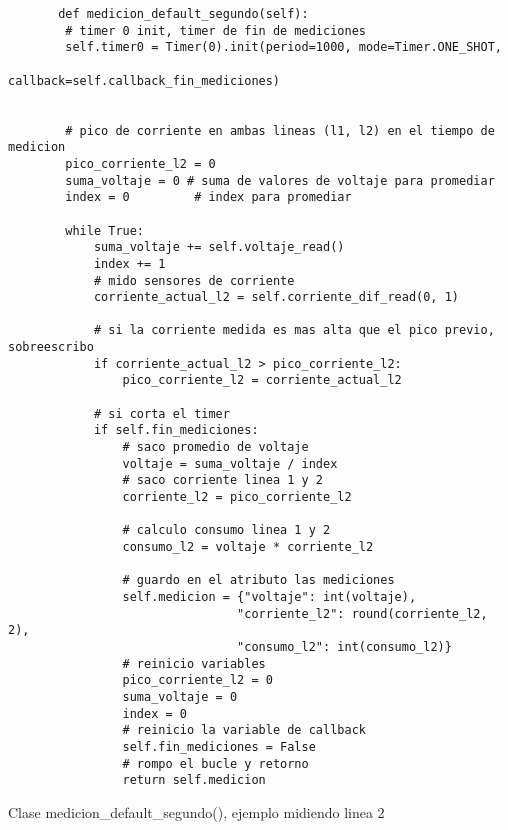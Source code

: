 \begin{listing}[H]
\begin{verbatim}
       def medicion_default_segundo(self):
        # timer 0 init, timer de fin de mediciones
        self.timer0 = Timer(0).init(period=1000, mode=Timer.ONE_SHOT, 
                                    callback=self.callback_fin_mediciones) 


        # pico de corriente en ambas lineas (l1, l2) en el tiempo de medicion
        pico_corriente_l2 = 0
        suma_voltaje = 0 # suma de valores de voltaje para promediar
        index = 0         # index para promediar
       
        while True:
            suma_voltaje += self.voltaje_read()
            index += 1
            # mido sensores de corriente
            corriente_actual_l2 = self.corriente_dif_read(0, 1)

            # si la corriente medida es mas alta que el pico previo, sobreescribo
            if corriente_actual_l2 > pico_corriente_l2:
                pico_corriente_l2 = corriente_actual_l2
                
            # si corta el timer
            if self.fin_mediciones:
                # saco promedio de voltaje
                voltaje = suma_voltaje / index
                # saco corriente linea 1 y 2
                corriente_l2 = pico_corriente_l2

                # calculo consumo linea 1 y 2
                consumo_l2 = voltaje * corriente_l2
               
                # guardo en el atributo las mediciones
                self.medicion = {"voltaje": int(voltaje),
                                "corriente_l2": round(corriente_l2, 2),
                                "consumo_l2": int(consumo_l2)}
                # reinicio variables                
                pico_corriente_l2 = 0
                suma_voltaje = 0
                index = 0
                # reinicio la variable de callback
                self.fin_mediciones = False
                # rompo el bucle y retorno
                return self.medicion
\end{verbatim}
\caption{Clase medicion\_default\_segundo(), ejemplo midiendo linea 2}
\label{medicion default segundo}
\end{listing}

